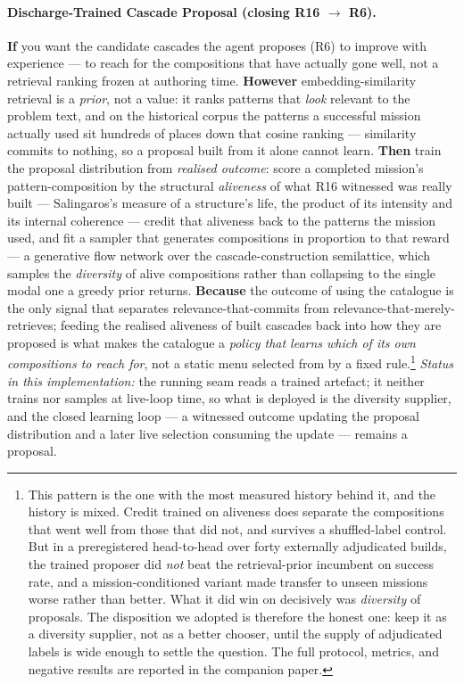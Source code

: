 \paragraph{Discharge-Trained Cascade Proposal (closing R16 $\rightarrow$ R6).} \textbf{If} you want the candidate cascades the agent proposes (R6) to improve with experience --- to reach for the compositions that have actually gone well, not a retrieval ranking frozen at authoring time. \textbf{However} embedding-similarity retrieval is a \emph{prior}, not a value: it ranks patterns that \emph{look} relevant to the problem text, and on the historical corpus the patterns a successful mission actually used sit hundreds of places down that cosine ranking --- similarity commits to nothing, so a proposal built from it alone cannot learn. \textbf{Then} train the proposal distribution from \emph{realised outcome}: score a completed mission's pattern-composition by the structural \emph{aliveness} of what R16 witnessed was really built --- Salingaros's measure of a structure's life, the product of its intensity and its internal coherence --- credit that aliveness back to the patterns the mission used, and fit a sampler that generates compositions in proportion to that reward --- a generative flow network over the cascade-construction semilattice, which samples the \emph{diversity} of alive compositions rather than collapsing to the single modal one a greedy prior returns. \textbf{Because} the outcome of using the catalogue is the only signal that separates relevance-that-commits from relevance-that-merely-retrieves; feeding the realised aliveness of built cascades back into how they are proposed is what makes the catalogue a \emph{policy that learns which of its own compositions to reach for}, not a static menu selected from by a fixed rule.\footnote{This pattern is the one with the most measured history behind it, and the history is mixed.  Credit trained on aliveness does separate the compositions that went well from those that did not, and survives a shuffled-label control.  But in a preregistered head-to-head over forty externally adjudicated builds, the trained proposer did \emph{not} beat the retrieval-prior incumbent on success rate, and a mission-conditioned variant made transfer to unseen missions worse rather than better.  What it did win on decisively was \emph{diversity} of proposals.  The disposition we adopted is therefore the honest one: keep it as a diversity supplier, not as a better chooser, until the supply of adjudicated labels is wide enough to settle the question.  The full protocol, metrics, and negative results are reported in the companion paper.}  \emph{Status in this implementation:} the running seam reads a trained artefact; it neither trains nor samples at live-loop time, so what is deployed is the diversity supplier, and the closed learning loop --- a witnessed outcome updating the proposal distribution and a later live selection consuming the update --- remains a proposal.

